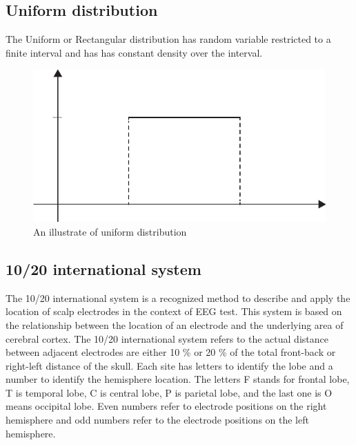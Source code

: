 \subsection{Uniform distribution\cite{ref11}}

\hspace{1.5cm} The Uniform or Rectangular distribution has random variable  restricted to a finite interval  and has  has constant density over the interval.
\begin{figure}[h]
	\centering
	\includegraphics[scale = 0.8]{chapter3/34.pdf}
	\caption{An illustrate of uniform distribution}
\end{figure}

\subsection{10/20 international system}
\hspace{1.5cm} The 10/20 international system is a recognized method to describe and apply the location of scalp electrodes in the context of EEG test. This system is based on the relationship between the location of an electrode and the underlying area of cerebral cortex. The 10/20 international system refers to the actual distance between adjacent electrodes are either 10 \% or 20 \% of the total front-back or right-left distance of the skull. Each site has letters to identify the lobe and a number to identify the hemisphere location. The letters F stands for frontal lobe, T is temporal lobe, C is central lobe, P is parietal lobe, and the last one is O means occipital lobe. Even numbers refer to electrode positions on the right hemisphere and odd numbers refer to the electrode positions on the left hemisphere.

